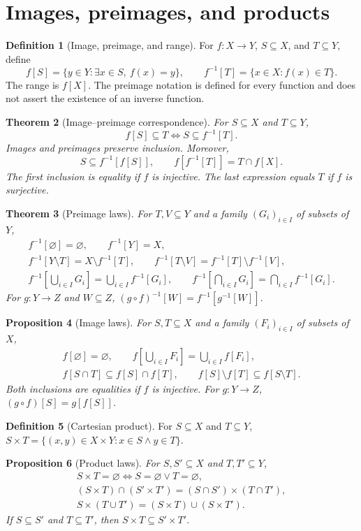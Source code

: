 \documentclass[11pt]{article}
\newtheorem{theorem}{Theorem}[section]
\newtheorem{proposition}[theorem]{Proposition}
\theoremstyle{definition}
\newtheorem{definition}[theorem]{Definition}
\begin{document}
\newpage
\section{Images, preimages, and products}
\begin{definition}[Image, preimage, and range]
For $f:X\to Y$, $S\subseteq X$, and $T\subseteq Y$, define
\[
f[S]=\{y\in Y:\exists x\in S,\ f(x)=y\},\qquad
f^{-1}[T]=\{x\in X:f(x)\in T\}.
\]
The range is $f[X]$. The preimage notation is defined for every function
and does not assert the existence of an inverse function.
\end{definition}
\begin{theorem}[Image--preimage correspondence]
For $S\subseteq X$ and $T\subseteq Y$,
\[
f[S]\subseteq T\iff S\subseteq f^{-1}[T].
\]
Images and preimages preserve inclusion. Moreover,
\[
S\subseteq f^{-1}[f[S]],\qquad f[f^{-1}[T]]=T\cap f[X].
\]
The first inclusion is equality if $f$ is injective. The last expression
equals $T$ if $f$ is surjective.
\end{theorem}
\begin{theorem}[Preimage laws]
For $T,V\subseteq Y$ and a family $(G_i)_{i\in I}$ of subsets of $Y$,
\begin{gather*}
f^{-1}[\varnothing]=\varnothing,\qquad f^{-1}[Y]=X,\\
f^{-1}[Y\setminus T]=X\setminus f^{-1}[T],\qquad
f^{-1}[T\setminus V]=f^{-1}[T]\setminus f^{-1}[V],\\
f^{-1}\!\left[\bigcup_{i\in I}G_i\right]=\bigcup_{i\in I}f^{-1}[G_i],\qquad
f^{-1}\!\left[\bigcap_{i\in I}G_i\right]=\bigcap_{i\in I}f^{-1}[G_i].
\end{gather*}
For $g:Y\to Z$ and $W\subseteq Z$,
$(g\circ f)^{-1}[W]=f^{-1}[g^{-1}[W]]$.
\end{theorem}
\begin{proposition}[Image laws]
For $S,T\subseteq X$ and a family $(F_i)_{i\in I}$ of subsets of $X$,
\begin{gather*}
f[\varnothing]=\varnothing,\qquad
f\!\left[\bigcup_{i\in I}F_i\right]=\bigcup_{i\in I}f[F_i],\\
f[S\cap T]\subseteq f[S]\cap f[T],\qquad
f[S]\setminus f[T]\subseteq f[S\setminus T].
\end{gather*}
Both inclusions are equalities if $f$ is injective.
For $g:Y\to Z$, $(g\circ f)[S]=g[f[S]]$.
\end{proposition}
\begin{definition}[Cartesian product]
For $S\subseteq X$ and $T\subseteq Y$,
$S\times T=\{(x,y)\in X\times Y:x\in S\land y\in T\}$.
\end{definition}
\begin{proposition}[Product laws]
For $S,S'\subseteq X$ and $T,T'\subseteq Y$,
\begin{gather*}
S\times T=\varnothing\iff S=\varnothing\lor T=\varnothing,\\
(S\times T)\cap(S'\times T')=(S\cap S')\times(T\cap T'),\\
S\times(T\cup T')=(S\times T)\cup(S\times T').
\end{gather*}
If $S\subseteq S'$ and $T\subseteq T'$, then $S\times T\subseteq S'\times T'$.
\end{proposition}
\end{document}
